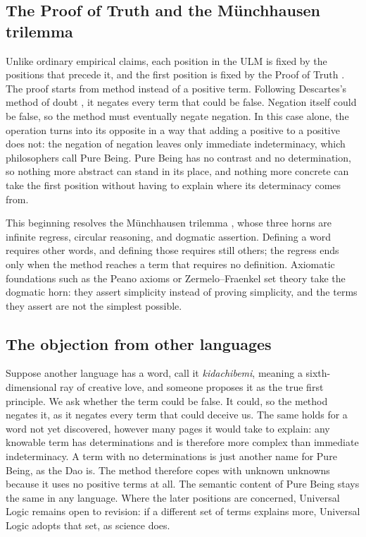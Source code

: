\documentclass[twocolumn]{ulpaper}
\begin{document}
\subsection{The Proof of Truth and the Münchhausen trilemma}

Unlike ordinary empirical claims, each position in the ULM is fixed by the positions that precede it, and the first position is fixed by the Proof of Truth \citep{mccormack2026proof}. The proof starts from method instead of a positive term. Following Descartes's method of doubt \citep{descartes1641meditations}, it negates every term that could be false. Negation itself could be false, so the method must eventually negate negation. In this case alone, the operation turns into its opposite in a way that adding a positive to a positive does not: the negation of negation leaves only immediate indeterminacy, which philosophers call Pure Being. Pure Being has no contrast and no determination, so nothing more abstract can stand in its place, and nothing more concrete can take the first position without having to explain where its determinacy comes from.

This beginning resolves the Münchhausen trilemma \citep{albert1985treatise}, whose three horns are infinite regress, circular reasoning, and dogmatic assertion. Defining a word requires other words, and defining those requires still others; the regress ends only when the method reaches a term that requires no definition. Axiomatic foundations such as the Peano axioms or Zermelo--Fraenkel set theory take the dogmatic horn: they assert simplicity instead of proving simplicity, and the terms they assert are not the simplest possible.

\subsection{The objection from other languages}

Suppose another language has a word, call it \emph{kidachibemi}, meaning a sixth-dimensional ray of creative love, and someone proposes it as the true first principle. We ask whether the term could be false. It could, so the method negates it, as it negates every term that could deceive us. The same holds for a word not yet discovered, however many pages it would take to explain: any knowable term has determinations and is therefore more complex than immediate indeterminacy. A term with no determinations is just another name for Pure Being, as the Dao is. The method therefore copes with unknown unknowns because it uses no positive terms at all. The semantic content of Pure Being stays the same in any language. Where the later positions are concerned, Universal Logic remains open to revision: if a different set of terms explains more, Universal Logic adopts that set, as science does.
\end{document}

